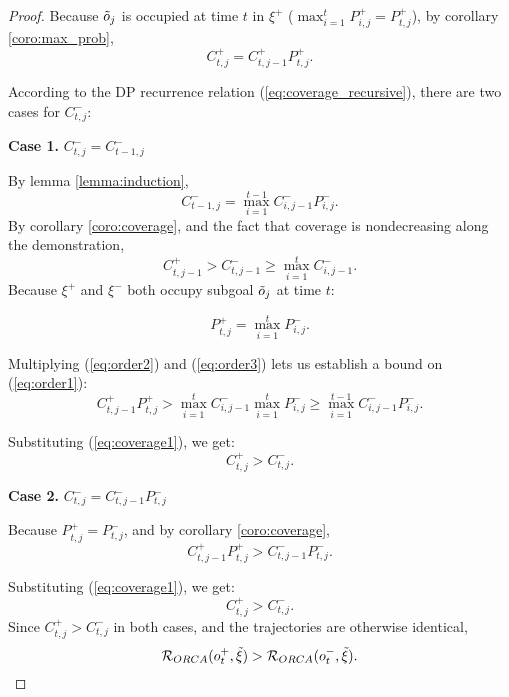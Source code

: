 \begin{proof} \label{proof:ordering}
Because $\tilde{o}_j$ is occupied at time $t$ in $\xi^+$ ($\max_{i=1}^{t} P^+_{i, j} = P^+_{t, j}$),  by corollary \ref{coro:max_prob},
\begin{equation} \label{eq:coverage1}
C^{+}_{t, j} = C^{+}_{t, j-1}P^{+}_{t, j}.
\end{equation}

According to the DP recurrence relation (\ref{eq:coverage_recursive}), there are two cases for $C^{-}_{t, j}$:

\textbf{Case 1.} $C^{-}_{t, j} = C^{-}_{t-1, j}$

By lemma \ref{lemma:induction}, 
\begin{equation}
\label{eq:order1}
C^{-}_{t-1, j} = \max_{i=1}^{t-1} C^{-}_{i, j-1} P^{-}_{i, j}.
\end{equation}
By corollary \ref{coro:coverage}, and the fact that coverage is nondecreasing along the demonstration,
\begin{equation}
\label{eq:order2}
C^{+}_{t, j-1} > C^{-}_{t, j-1} \geq \max_{i=1}^{t} C^{-}_{i, j-1}.
\end{equation}
Because $\xi^{+}$ and $\xi^{-}$ both occupy subgoal $\tilde{o}_j$ at time $t$:

\begin{equation}
\label{eq:order3}
P^{+}_{t, j} = \max_{i=1}^{t} P^{-}_{i, j}.
\end{equation}

Multiplying (\ref{eq:order2}) and (\ref{eq:order3}) lets us establish a bound on (\ref{eq:order1}):
\begin{equation}
    C^{+}_{t, j-1}P^{+}_{t, j} > \max_{i=1}^{t} C^{-}_{i, j-1} \max_{i=1}^{t} P^{-}_{i, j} \geq
    \max_{i=1}^{t-1} C^{-}_{i, j-1} P^{-}_{i, j}.
\end{equation}

Substituting (\ref{eq:coverage1}), we get:
\begin{equation}
C^{+}_{t, j}  > C^{-}_{t, j}.
\end{equation}

\textbf{Case 2.} $C^{-}_{t, j} =  C^{-}_{t, j-1}P^{-}_{t, j}$

Because $P^{+}_{t, j} = P^{-}_{t, j}$, and by corollary \ref{coro:coverage},
\begin{equation}
C^{+}_{t, j-1} P^{+}_{t, j} > C^{-}_{t, j-1}P^{-}_{t, j}.
\end{equation}

Substituting (\ref{eq:coverage1}), we get:
\begin{equation}
C^{+}_{t, j} > C^{-}_{t, j}.
\end{equation}
Since $C^{+}_{t, j} > C^{-}_{t, j}$ in both cases, and the trajectories are otherwise identical,
\begin{equation}
\mathcal{R}_{ORCA}(o^{+}_t, \tilde{\xi}) > \mathcal{R}_{ORCA}(o^{-}_t, \tilde{\xi}).
\end{equation}
\end{proof}

